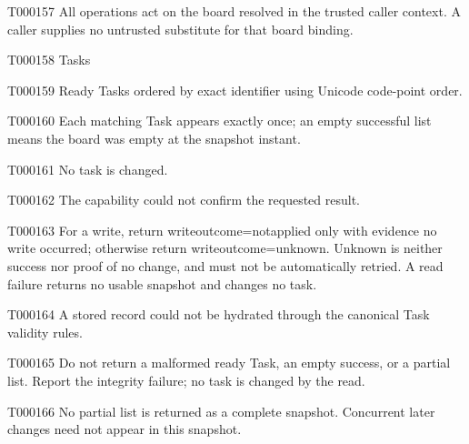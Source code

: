 \documentclass[11pt,a4paper]{article}
\begin{document}
\begin{atlasparagraph}{T000157}
All operations act on the board resolved in the trusted caller context. A caller supplies no untrusted substitute for that board binding.
\end{atlasparagraph}
\begin{atlastext}{T000158}
Tasks
\end{atlastext}
\begin{atlasparagraph}{T000159}
Ready Tasks ordered by exact identifier using Unicode code-point order.
\end{atlasparagraph}
\begin{atlasparagraph}{T000160}
Each matching Task appears exactly once; an empty successful list means the board was empty at the snapshot instant.
\end{atlasparagraph}
\begin{atlasparagraph}{T000161}
No task is changed.
\end{atlasparagraph}
\begin{atlasparagraph}{T000162}
The capability could not confirm the requested result.
\end{atlasparagraph}
\begin{atlasparagraph}{T000163}
For a write, return write\AtlasCharUnderscore{}outcome=not\AtlasCharUnderscore{}applied only with evidence no write occurred; otherwise return write\AtlasCharUnderscore{}outcome=unknown. Unknown is neither success nor proof of no change, and must not be automatically retried. A read failure returns no usable snapshot and changes no task.
\end{atlasparagraph}
\begin{atlasparagraph}{T000164}
A stored record could not be hydrated through the canonical Task validity rules.
\end{atlasparagraph}
\begin{atlasparagraph}{T000165}
Do not return a malformed ready Task, an empty success, or a partial list. Report the integrity failure; no task is changed by the read.
\end{atlasparagraph}
\begin{atlasparagraph}{T000166}
No partial list is returned as a complete snapshot. Concurrent later changes need not appear in this snapshot.
\end{atlasparagraph}
\end{document}
